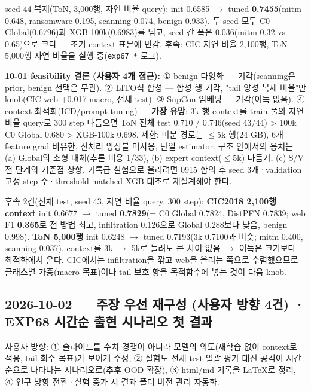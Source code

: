 seed 44 복제(ToN, 3,000행, 자연 비율 query): init 0.6585  \ensuremath{\rightarrow}  tuned \textbf{0.7455}(mitm 0.648, ransomware 0.195, scanning 0.074, benign 0.933). 두 seed 모두 C0 Global(0.6796)과 XGB-100k(0.6983)를 넘고, seed 간 폭은 0.036(mitm 0.32 vs 0.65)으로 크다 — 초기 context 표본에 민감. 후속: CIC 자연 비율 2,100행, ToN 5,000행 자연 비율을 실행 중(\texttt{exp67\_\allowbreak{}\allowbreak{}*} 로그).

\textbf{10-01 feasibility 결론 (사용자 4개 접근):} ① benign 다양화 — 기각(scanning은 prior, benign 선택은 무관). ② LITO식 합성 — 합성 행 기각, "tail 양성 복제 비율"만 knob(CIC web +\allowbreak{}0.017 macro, 전체 test). ③ SupCon 임베딩 — 기각(이득 없음). ④ context 최적화(ICD/\allowbreak{}prompt tuning) — \textbf{가장 유망}: 3k 행 context를 train 풀의 자연 비율 query로 300 step 다듬으면 ToN 전체 test 0.710 /\allowbreak{} 0.746(seed 43/\allowbreak{}44) > 100k C0 Global 0.680 > XGB-100k 0.698. 제한: 미분 경로는 \ensuremath{\leq}5k 행(24 GB), 6개 feature grad 비유한, 전처리 앙상블 미사용, 단일 estimator. 구조 안에서의 용처는 (a) Global의 소형 대체(추론 비용 1/\allowbreak{}33), (b) expert context(\ensuremath{\leq}5k) 다듬기, (c) S/\allowbreak{}V 전 단계의 기준점 상향. 기록급 실험으로 올리려면 0915 합의 후 seed 3개·validation 고정 step 수·threshold-matched XGB 대조로 재설계해야 한다.

후속 2건(전체 test, seed 43, 자연 비율 query, 300 step): \textbf{CIC2018 2,100행 context} init 0.6677  \ensuremath{\rightarrow}  tuned \textbf{0.7829}(=\allowbreak{} C0 Global 0.7824, DistPFN 0.7839; web F1 \textbf{0.365}로 전 방법 최고, infiltration 0.126으로 Global 0.288보다 낮음, benign 0.998). \textbf{ToN 5,000행} init 0.6248  \ensuremath{\rightarrow}  tuned 0.7193(3k 0.7100과 비슷; mitm 0.400, scanning 0.037). context를 3k \ensuremath{\rightarrow} 5k로 늘려도 큰 차이 없음  \ensuremath{\rightarrow}  이득은 크기보다 최적화에서 온다. CIC에서는 infiltration을 깎고 web을 올리는 쪽으로 수렴했으므로 클래스별 가중(macro 목표)이나 tail 보호 항을 목적함수에 넣는 것이 다음 knob.

\subsection{2026-10-02 — 주장 우선 재구성 (사용자 방향 4건) · EXP68 시간순 출현 시나리오 첫 결과}
사용자 방향: ① 슬라이드를 수치 경쟁이 아니라 모델의 의도(재학습 없이 context로 적응, tail 회수 목표)가 보이게 수정, ② 실험도 전체 test 일괄 평가 대신 공격이 시간순으로 나타나는 시나리오로(추후 OOD 확장), ③ html/\allowbreak{}md 기록을 LaTeX로 정리, ④ 연구 방향 전환·실험 증가 시 결과 폴더 버전 관리 자동화.

